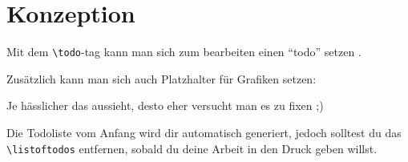 \section{Konzeption}\label{sec:konzeption}

Mit dem \lstinline{\todo}-tag kann man sich zum bearbeiten einen \enquote{todo} setzen .

Zusätzlich kann man sich auch Platzhalter für Grafiken setzen:


Je hässlicher das aussieht, desto eher versucht man es zu fixen ;)

Die Todoliste vom Anfang wird dir automatisch generiert, jedoch solltest du das \lstinline{\listoftodos} entfernen, sobald du deine Arbeit in den Druck geben willst.
